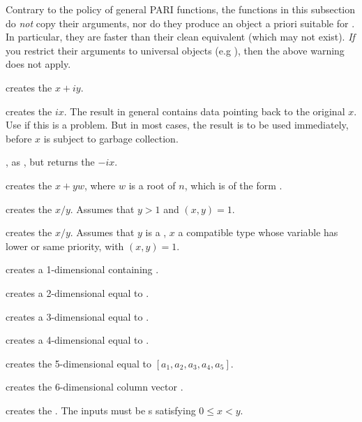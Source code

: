 \label{se:unclean}

Contrary to the policy of general PARI functions, the functions in this
subsection do \emph{not} copy their arguments, nor do they produce an object
a priori suitable for . In particular, they are
faster than their clean equivalent (which may not exist). \emph{If} you
restrict their arguments to universal objects (e.g ),
then the above warning does not apply.

 creates the  $x + iy$.

 creates the  $ix$. The result in
general contains data pointing back to the original $x$. Use  if
this is a problem. But in most cases, the result is to be used immediately,
before $x$ is subject to garbage collection.

, as , but returns the 
$-ix$.

 creates the  $x + yw$,
where $w$ is a root of $n$, which is of the form .

 creates the  $x/y$. Assumes that
$y > 1$ and $(x,y) = 1$.

 creates the  $x/y$. Assumes
that $y$ is a , $x$ a compatible type whose variable has lower
or same priority, with $(x,y) = 1$.

 creates a 1-dimensional  containing .

 creates a 2-dimensional  equal to
\kbd{[x,y]}.

 creates a 3-dimensional 
equal to \kbd{[x,y,z]}.

 creates a 4-dimensional 
equal to \kbd{[x,y,z,t]}.

 creates the
5-dimensional  equal to $[a_1,a_2,a_3,a_4,a_5]$.

creates the $6$-dimensional column vector \kbd{[x,y,z,t,u,v]~}.

 creates the  .
The inputs must be s satisfying $0 \leq x < y$.

